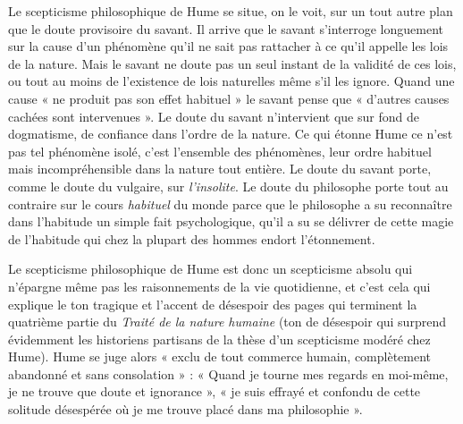 Le scepticisme philosophique de Hume se situe, on le
voit, sur un tout autre plan que le doute provisoire du
savant. Il arrive que le savant s'interroge longuement
sur la cause d’un phénomène qu’il ne sait pas rattacher
à ce qu’il appelle les lois de la nature. Mais le savant ne
doute pas un seul instant de la validité de ces lois, ou
tout au moins de l’existence de lois naturelles même s’il
les ignore. Quand une cause « ne produit pas son effet
habituel » le savant pense que « d’autres causes cachées
sont intervenues ». Le doute du savant n'intervient que
sur fond de dogmatisme, de confiance dans l’ordre de la
nature. Ce qui étonne Hume ce n’est pas tel phénomène
isolé, c’est l’ensemble des phénomènes, leur ordre habituel
mais incompréhensible dans la nature tout entière. Le
doute du savant porte, comme le doute du vulgaire, sur
{\it l’insolite}. Le doute du philosophe porte tout au contraire
sur le cours {\it habituel} du monde parce que le philosophe
a su reconnaître dans l’habitude un simple fait psychologique, qu’il a su se délivrer de cette magie de l'habitude qui chez la plupart des hommes endort l’étonnement.

Le scepticisme philosophique de Hume est donc un
scepticisme absolu qui n’épargne même pas les raisonnements
de la vie quotidienne, et c’est cela qui explique
le ton tragique et l’accent de désespoir des pages qui terminent
la quatrième partie du {\it Traité de la nature humaine}
(ton de désespoir qui surprend évidemment les historiens
partisans de la thèse d’un scepticisme modéré chez Hume).
Hume se juge alors « exclu de tout commerce humain,
complètement abandonné et sans consolation » : « Quand
je tourne mes regards en moi-même, je ne trouve que
doute et ignorance », « je suis effrayé et confondu de cette
solitude désespérée où je me trouve placé dans ma philosophie ».

